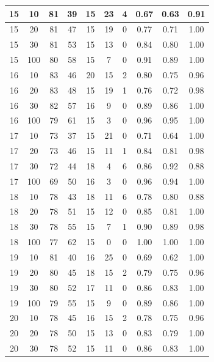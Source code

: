 \begin{longtable}{ |c|c|c|c|c|c|c|c|c|c| }
            15 & 10 & 81 & 39 & 15 & 23 & 4 & 0.67 & 0.63 & 0.91 \\ \hline
            15 & 20 & 81 & 47 & 15 & 19 & 0 & 0.77 & 0.71 & 1.00 \\ \hline
            15 & 30 & 81 & 53 & 15 & 13 & 0 & 0.84 & 0.80 & 1.00 \\ \hline
            15 & 100 & 80 & 58 & 15 & 7 & 0 & 0.91 & 0.89 & 1.00 \\ \hline
            16 & 10 & 83 & 46 & 20 & 15 & 2 & 0.80 & 0.75 & 0.96 \\ \hline
            16 & 20 & 83 & 48 & 15 & 19 & 1 & 0.76 & 0.72 & 0.98 \\ \hline
            16 & 30 & 82 & 57 & 16 & 9 & 0 & 0.89 & 0.86 & 1.00 \\ \hline
            16 & 100 & 79 & 61 & 15 & 3 & 0 & 0.96 & 0.95 & 1.00 \\ \hline
            17 & 10 & 73 & 37 & 15 & 21 & 0 & 0.71 & 0.64 & 1.00 \\ \hline
            17 & 20 & 73 & 46 & 15 & 11 & 1 & 0.84 & 0.81 & 0.98 \\ \hline
            17 & 30 & 72 & 44 & 18 & 4 & 6 & 0.86 & 0.92 & 0.88 \\ \hline
            17 & 100 & 69 & 50 & 16 & 3 & 0 & 0.96 & 0.94 & 1.00 \\ \hline
            18 & 10 & 78 & 43 & 18 & 11 & 6 & 0.78 & 0.80 & 0.88 \\ \hline
            18 & 20 & 78 & 51 & 15 & 12 & 0 & 0.85 & 0.81 & 1.00 \\ \hline
            18 & 30 & 78 & 55 & 15 & 7 & 1 & 0.90 & 0.89 & 0.98 \\ \hline
            18 & 100 & 77 & 62 & 15 & 0 & 0 & 1.00 & 1.00 & 1.00 \\ \hline
            19 & 10 & 81 & 40 & 16 & 25 & 0 & 0.69 & 0.62 & 1.00 \\ \hline
            19 & 20 & 80 & 45 & 18 & 15 & 2 & 0.79 & 0.75 & 0.96 \\ \hline
            19 & 30 & 80 & 52 & 17 & 11 & 0 & 0.86 & 0.83 & 1.00 \\ \hline
            19 & 100 & 79 & 55 & 15 & 9 & 0 & 0.89 & 0.86 & 1.00 \\ \hline
            20 & 10 & 78 & 45 & 16 & 15 & 2 & 0.78 & 0.75 & 0.96 \\ \hline
            20 & 20 & 78 & 50 & 15 & 13 & 0 & 0.83 & 0.79 & 1.00 \\ \hline
            20 & 30 & 78 & 52 & 15 & 11 & 0 & 0.86 & 0.83 & 1.00 \\ \hline

\end{longtable}
